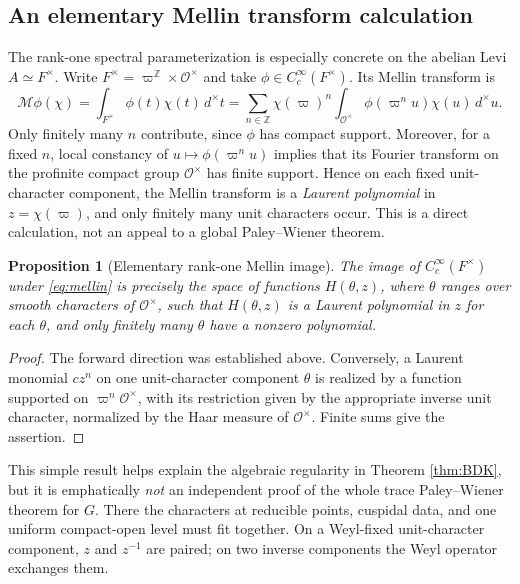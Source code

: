 \documentclass[12pt,letterpaper]{amsart}
\numberwithin{equation}{section}
\newtheorem{proposition}[theorem]{Proposition}
\theoremstyle{definition}
\theoremstyle{remark}
\begin{document}
\subsection{An elementary Mellin transform calculation}\label{sec:mellin}
The rank-one spectral parameterization is especially concrete on the abelian Levi $A\simeq F^\times$. Write $F^\times=\varpi^{\mathbb Z}\times\mathcal O^\times$ and take $\phi\in C_c^\infty(F^\times)$.  Its Mellin transform is
\begin{equation}\label{eq:mellin}
\mathcal M\phi(\chi)=\int_{F^\times}\phi(t)\chi(t)\,d^\times t
=\sum_{n\in\mathbb Z}\chi(\varpi)^n
\int_{\mathcal O^\times}\phi(\varpi^n u)\chi(u)\,d^\times u.
\end{equation}
Only finitely many $n$ contribute, since $\phi$ has compact support. Moreover, for a fixed $n$, local constancy of $u\mapsto\phi(\varpi^n u)$ implies that its Fourier transform on the profinite compact group $\mathcal O^\times$ has finite support. Hence on each fixed unit-character component, the Mellin transform is a \emph{Laurent polynomial} in $z=\chi(\varpi)$, and only finitely many unit characters occur. This is a direct calculation, not an appeal to a global Paley--Wiener theorem.

\begin{proposition}[Elementary rank-one Mellin image]
The image of $C_c^\infty(F^\times)$ under \eqref{eq:mellin} is precisely the space of functions $H(\theta,z)$, where $\theta$ ranges over smooth characters of $\mathcal O^\times$, such that $H(\theta,z)$ is a Laurent polynomial in $z$ for each $\theta$, and only finitely many $\theta$ have a nonzero polynomial.
\end{proposition}
\begin{proof}
The forward direction was established above. Conversely, a Laurent monomial $c z^n$ on one unit-character component $\theta$ is realized by a function supported on $\varpi^n\mathcal O^\times$, with its restriction given by the appropriate inverse unit character, normalized by the Haar measure of $\mathcal O^\times$. Finite sums give the assertion.
\end{proof}

This simple result helps explain the algebraic regularity in Theorem \ref{thm:BDK}, but it is emphatically \emph{not} an independent proof of the whole trace Paley--Wiener theorem for $G$. There the characters at reducible points, cuspidal data, and one uniform compact-open level must fit together. On a Weyl-fixed unit-character component, $z$ and $z^{-1}$ are paired; on two inverse components the Weyl operator exchanges them.
\end{document}
